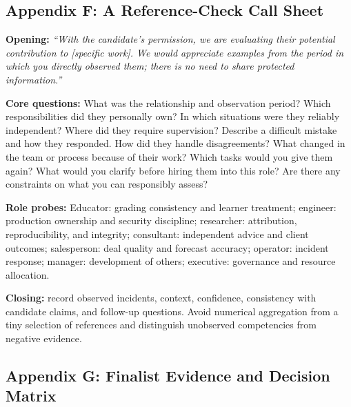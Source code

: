\subsection*{Appendix F: A Reference-Check Call Sheet}

\textbf{Opening:} \textit{``With the candidate's permission, we are evaluating their potential contribution to [specific work]. We would appreciate examples from the period in which you directly observed them; there is no need to share protected information.''}

\textbf{Core questions:} What was the relationship and observation period? Which responsibilities did they personally own? In which situations were they reliably independent? Where did they require supervision? Describe a difficult mistake and how they responded. How did they handle disagreements? What changed in the team or process because of their work? Which tasks would you give them again? What would you clarify before hiring them into this role? Are there any constraints on what you can responsibly assess?

\textbf{Role probes:} Educator: grading consistency and learner treatment; engineer: production ownership and security discipline; researcher: attribution, reproducibility, and integrity; consultant: independent advice and client outcomes; salesperson: deal quality and forecast accuracy; operator: incident response; manager: development of others; executive: governance and resource allocation.

\textbf{Closing:} record observed incidents, context, confidence, consistency with candidate claims, and follow-up questions. Avoid numerical aggregation from a tiny selection of references and distinguish unobserved competencies from negative evidence.

\subsection*{Appendix G: Finalist Evidence and Decision Matrix}

